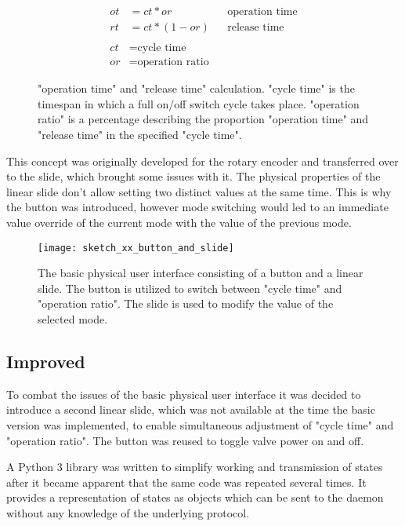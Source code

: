 \begin{figure}[h]
\begin{align*}
    ot &=ct * or && \text{operation time} \\
    rt &=ct * (1 - or) && \text{release time} \\ \\
    ct &= \text{cycle time} \\
    or &= \text{operation ratio}
\end{align*}
\caption{"operation time" and "release time" calculation. "cycle time" is the timespan in which a full on/off switch cycle takes place. "operation ratio" is a percentage describing the proportion "operation time" and "release time" in the specified "cycle time".}
\end{figure}

This concept was originally developed for the rotary encoder and transferred over to the slide, which brought some issues with it. The physical properties of the linear slide don't allow setting two distinct values at the same time. This is why the button was introduced, however mode switching would led to an immediate value override of the current mode with the value of the previous mode.

\begin{figure}[h]
\centering

\texttt{[image: sketch\_xx\_button\_and\_slide]}


\caption{The basic physical user interface consisting of a button and a linear slide. The button is utilized to switch between "cycle time" and "operation ratio". The slide is used to modify the value of the selected mode.}
\end{figure}

\subsection{Improved}
To combat the issues of the basic physical user interface it was decided to introduce a second linear slide, which was not available at the time the basic version was implemented, to enable simultaneous adjustment of "cycle time" and "operation ratio". The button was reused to toggle valve power on and off.

A Python 3 library was written to simplify working and transmission of states after it became apparent that the same code was repeated several times. It provides a representation of states as objects which can be sent to the daemon without any knowledge of the underlying protocol. 

